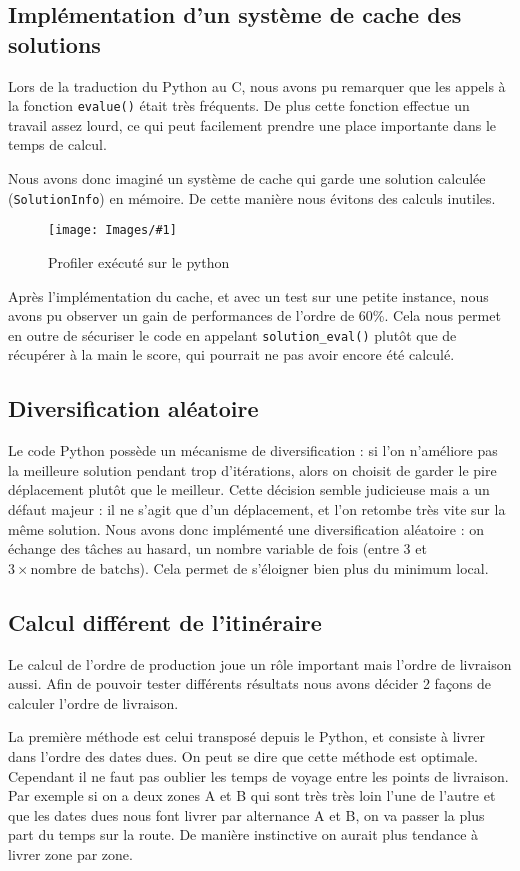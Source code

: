 \documentclass[hideweeklyreports]{polytech/polytech}
\newcommand{\img}[3]{%
	\begin{figure}[H]
		\centering
   		\texttt{[image: Images/\#1]}
  	 	\caption{#2}
	\end{figure}
}
\newcommand{\codec}[1]{\texttt{#1}}
\begin{document}
			\subsection{\label{cache}Implémentation d'un système de cache des solutions}
				Lors de la traduction du Python au C, nous avons pu remarquer que les appels à la fonction \codec{evalue()} était très fréquents. De plus cette fonction effectue un travail assez lourd, ce qui peut facilement prendre une place importante dans le temps de calcul.
				
				Nous avons donc imaginé un système de cache qui garde une solution calculée (\codec{SolutionInfo}) en mémoire. De cette manière nous évitons des calculs inutiles.
				
				\img{PythonProfilerTop.png}{Profiler exécuté sur le python}{0.3}
				
				Après l'implémentation du cache, et avec un test sur une petite instance, nous avons pu observer un gain de performances de l'ordre de 60\%. Cela nous permet en outre de sécuriser le code en appelant \codec{solution\_eval()} plutôt que de récupérer à la main le score, qui pourrait ne pas avoir encore été calculé.
			
			\subsection{Diversification aléatoire}
				Le code Python possède un mécanisme de diversification : si l'on n'améliore pas la meilleure solution pendant trop d'itérations, alors on choisit de garder le pire déplacement plutôt que le meilleur. Cette décision semble judicieuse mais a un défaut majeur : il ne s'agit que d'un déplacement, et l'on retombe très vite sur la même solution. Nous avons donc implémenté une diversification aléatoire : on échange des tâches au hasard, un nombre variable de fois (entre 3 et $3 \times \text{nombre de batchs}$). Cela permet de s'éloigner bien plus du minimum local.
				
			\subsection{Calcul différent de l'itinéraire}
				Le calcul de l'ordre de production joue un rôle important mais l'ordre de livraison aussi. Afin de pouvoir tester différents résultats nous avons décider 2 façons de calculer l'ordre de livraison.
				
				La première méthode est celui transposé depuis le Python, et consiste à livrer dans l'ordre des dates dues. On peut se dire que cette méthode est optimale. Cependant il ne faut pas oublier les temps de voyage entre les points de livraison. Par exemple si on a deux zones A et B qui sont très très loin l'une de l'autre et que les dates dues nous font livrer par alternance A et B, on va passer la plus part du temps sur la route. De manière instinctive on aurait plus tendance à livrer zone par zone.
				
\end{document}
